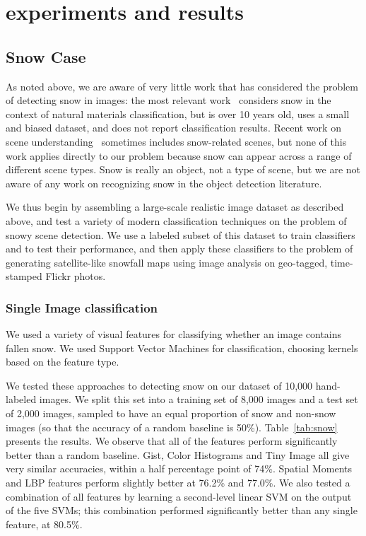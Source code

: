 \section{experiments and results}
\label{sec:experiments}



\subsection{Snow Case}
As noted above, we are aware of very little work that has considered
the problem of detecting snow in images: the most relevant
work~\cite{singhal2003spatialcontext} considers snow in the context of
natural materials classification, but is over 10 years old, uses a
small and biased dataset, and does not report classification results.
Recent work on scene understanding~\cite{XiaoHEOT10} sometimes
includes snow-related scenes, but none of this work applies directly
to our problem because snow can appear across a range of different
scene types. Snow is really an object, not a type of scene, but we are
not aware of any work on recognizing snow in the object detection
literature.

We thus begin by assembling a large-scale realistic image dataset as described above, and test a variety of modern classification techniques on the
problem of snowy scene detection. We use a labeled subset of this
dataset to train classifiers and to test their performance, and then
apply these classifiers to the problem of generating satellite-like
snowfall maps using image analysis on geo-tagged, time-stamped
Flickr photos.

\subsubsection{Single Image classification}

We used a variety of visual features for classifying
whether an image contains fallen snow. We used Support Vector
Machines for classification, choosing kernels based on the feature
type. 

We tested these approaches to detecting snow on our dataset of
10,000 hand-labeled images. We split this set into a training set of
8,000 images and a test set of 2,000 images, sampled to have an
 equal proportion of snow and non-snow images (so
that the accuracy of a random baseline is 50\%).
Table~\ref{tab:snow} presents the results. We observe that all of the
features perform significantly better than a random baseline. 
Gist, Color Histograms and Tiny Image all give very similar accuracies, within a half
percentage point of 74\%. Spatial Moments and
LBP  features perform
slightly better at 76.2\% and 77.0\%. We also tested a combination of all 
features by learning a second-level linear SVM on the output of the
five SVMs; this combination performed significantly better than any single feature,
at 80.5\%.



